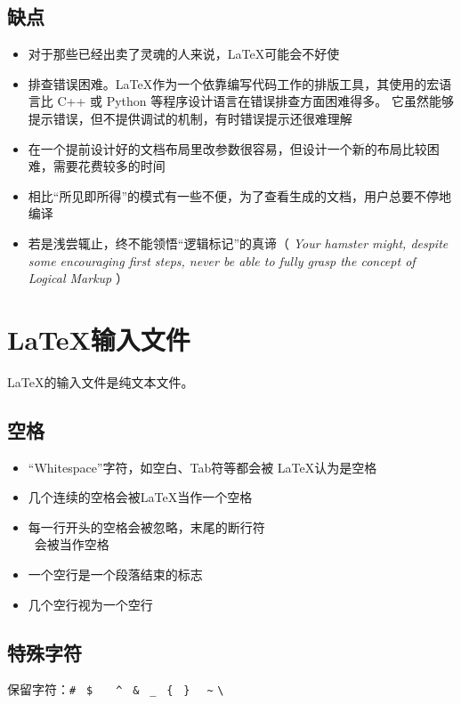 \documentclass[UTF8]{ctexart}
\begin{document}
\subsection{缺点}
\begin{itemize}
    \item 对于那些已经出卖了灵魂的人来说，\LaTeX 可能会不好使
    \item 排查错误困难。\LaTeX 作为一个依靠编写代码工作的排版工具，其使用的宏语言比 C++ 或 Python 等程序设计语言在错误排查方面困难得多。
        它虽然能够提示错误，但不提供调试的机制，有时错误提示还很难理解
    \item 在一个提前设计好的文档布局里改参数很容易，但设计一个新的布局比较困难，需要花费较多的时间
    \item 相比“所见即所得”的模式有一些不便，为了查看生成的文档，用户总要不停地编译
    \item 若是浅尝辄止，终不能领悟“逻辑标记”的真谛（\emph{ Your hamster might, despite some encouraging first steps,
        never be able to fully grasp the concept of Logical Markup } ）
\end{itemize}

\section{\LaTeX 输入文件}
\LaTeX 的输入文件是纯文本文件。
\subsection{空格}
\begin{itemize}
    \item “Whitespace”字符，如空白、Tab符等都会被 \LaTeX 认为是空格
    \item 几个连续的空格会被\LaTeX 当作一个空格
    \item 每一行开头的空格会被忽略，末尾的断行符~\texttt{\\}~会被当作空格
    \item 一个空行是一个段落结束的标志
    \item 几个空行视为一个空行
\end{itemize}
\subsection{特殊字符}
保留字符：\qquad \texttt{\#} \qquad \texttt{~\$} \qquad \texttt{~~~\^} \qquad \texttt{~\&} \qquad \texttt{~\_} \qquad
\texttt{~\{} \qquad \texttt{~\}} \qquad \texttt{~~\~} \qquad \texttt{\textbackslash}
\end{document}
